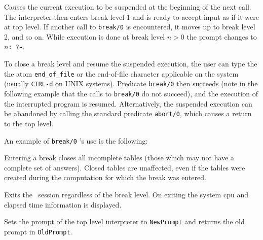 \begin{description}

    Causes the current execution to be suspended at the beginning of the next 
    call.  The interpreter then enters break level 1 and is ready to accept
    input as if it were at top level.  If another call to {\tt break/0} is 
    encountered, it moves up to break level 2, and so on.  While execution 
    is done at break level $n>0$ the prompt changes to {\tt $n$: ?-}.

    To close a break level and resume the suspended execution, the user can 
    type the the atom {\tt end\_of\_file} or the end-of-file character 
    applicable on the system (usually {\tt CTRL-d} on UNIX systems).  
    Predicate {\tt break/0} 
    then succeeds (note in the following example that the calls to {\tt break/0}
    do not succeed), and the execution of the interrupted program is resumed.  
    Alternatively, the suspended execution can be abandoned by calling the 
    standard predicate {\tt abort/0}, which causes a return to the top level.

    An example of {\tt break/0} 's use is the following:


    Entering a break closes all incomplete tables (those which may not have a 
    complete set of answers).  Closed tables are unaffected, even if 
    the tables were created during the computation for which the break was
    entered.

    Exits the \ourprolog\ session regardless of the break level.  On exiting
    the system cpu and elapsed time information is displayed.

    Sets the prompt of the top level interpreter to {\tt NewPrompt} and 
    returns the old prompt in {\tt OldPrompt}.


\end{description}

